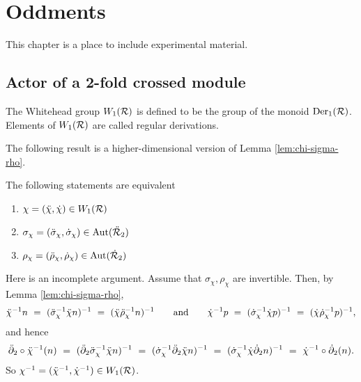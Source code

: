 
\section{Oddments}

This chapter is a place to include experimental material.

\bigskip

\subsection{Actor of a 2-fold crossed module} \label{subs:actor-xxmod}

\begin{defn}   
The Whitehead group $W_1(\mathcal{R})$ is defined to be the group of the monoid 
$\mathrm{Der}_1(\mathcal{R})$. 
Elements of $W_1(\mathcal{R})$ are called regular derivations.
\end{defn}

\noindent
The following result is a higher-dimensional version of
Lemma \ref{lem:chi-sigma-rho}.

\begin{lem} \label{lem:equiv-w1s}
The following statements are equivalent 
\begin{enumerate}[\rm (a)]
\item $\chi = (\ddot{\chi}, \dot{\chi}) \in W_1(\mathcal{R}) $
\item $\sigma_{\chi} = (\ddot{\sigma}_{\chi}, \dot{\sigma}_{\chi})  \in \mathrm{Aut}(\ddot{\mathcal{R}}_2)$
\item $ \rho_{\chi} = (\ddot{\rho}_{\chi}, \dot{\rho}_{\chi})  \in \mathrm{Aut}(\dot{\mathcal{R}}_2)$
\end{enumerate}
\end{lem}
\begin{pf}
Here is an incomplete argument.
Assume that $\sigma_{\chi}, \rho_{\chi}$ are invertible.
Then, by Lemma \ref{lem:chi-sigma-rho}, 
$$
\ddot{\chi}^{-1}n ~=~ (\ddot{\sigma}_{\chi}^{-1}\ddot{\chi} n)^{-1} 
            ~=~ (\ddot{\chi}\ddot{\rho}_{\chi}^{-1} n)^{-1}
\qquad\mbox{and}\qquad
\dot{\chi}^{-1}p ~=~ (\dot{\sigma}_{\chi}^{-1}\dot{\chi} p)^{-1} 
           ~=~ (\dot{\chi}\dot{\rho}_{\chi}^{-1} p)^{-1},
$$
and hence
$$
\ddot{\partial}_2 \circ \ddot{\chi}^{-1} (n)
~=~ (\ddot{\partial}_2 \ddot{\sigma}_{\chi}^{-1} \ddot{\chi} n)^{-1}
~=~ (\dot{\sigma}_{\chi}^{-1} \ddot{\partial}_2 \ddot{\chi} n)^{-1}
~=~ (\dot{\sigma}_{\chi}^{-1} \dot{\chi} \dot{\partial}_2 n)^{-1}
~=~ \dot{\chi}^{-1} \circ \dot{\partial}_2 (n).
$$
So $\chi^{-1} = (\ddot{\chi}^{-1},\dot{\chi}^{-1}) \in W_1(\mathcal{R})$.
\end{pf}

